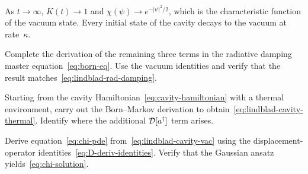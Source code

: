 \begin{keyresult}
  As $t \to \infty$, $K(t) \to 1$ and
  $\chi(\psi) \to e^{-\lvert\psi\rvert^2/2}$, which is the
  characteristic function of the vacuum state.  Every initial state of
  the cavity decays to the vacuum at rate~$\kappa$.
\end{keyresult}

\begin{exercise}\label{ex:lindblad-derivation}
  Complete the derivation of the remaining three terms in the radiative
  damping master equation~\eqref{eq:born-eq}.  Use the vacuum
  identities and verify that the result
  matches~\eqref{eq:lindblad-rad-damping}.
\end{exercise}

\begin{exercise}\label{ex:cavity-lindblad}
  Starting from the cavity Hamiltonian~\eqref{eq:cavity-hamiltonian}
  with a thermal environment, carry out the Born--Markov derivation
  to obtain~\eqref{eq:lindblad-cavity-thermal}.  Identify where the
  additional $\mathcal{D}[a^\dagger]$ term arises.
\end{exercise}

\begin{exercise}\label{ex:chi-pde-derivation}
  Derive equation~\eqref{eq:chi-pde} from~\eqref{eq:lindblad-cavity-vac}
  using the displacement-operator identities~\eqref{eq:D-deriv-identities}.
  Verify that the Gaussian ansatz yields~\eqref{eq:chi-solution}.
\end{exercise}
